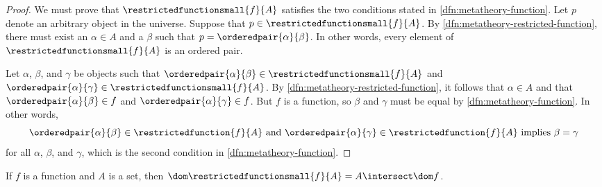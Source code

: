 \begin{proof}
    We must prove that \( \restrictedfunctionsmall{f}{A} \) satisfies the two conditions stated in \cref{dfn:metatheory-function}.
    Let \( p \) denote an arbitrary object in the universe. Suppose that \( p \in \restrictedfunctionsmall{f}{A} \).
    By \cref{dfn:metatheory-restricted-function}, there must exist an \( \alpha \in A \) and a \( \beta \) such that
    \( p = \orderedpair{\alpha}{\beta} \). In other words, every element of \( \restrictedfunctionsmall{f}{A} \) is an ordered pair.

    \vspace{0.3cm}
    \noindent
    Let \( \alpha \), \( \beta \), and \( \gamma \) be objects such that \( \orderedpair{\alpha}{\beta} \in \restrictedfunctionsmall{f}{A} \)
    and \( \orderedpair{\alpha}{\gamma} \in \restrictedfunctionsmall{f}{A} \).
    By \cref{dfn:metatheory-restricted-function}, it follows that \( \alpha \in A \) and that \( \orderedpair{\alpha}{\beta} \in f \)
    and \( \orderedpair{\alpha}{\gamma} \in f\).
    But \( f \) is a function, so \( \beta \) and \( \gamma \) must be equal by \cref{dfn:metatheory-function}.
    In other words,
    \begin{equation*}
        \orderedpair{\alpha}{\beta} \in \restrictedfunction{f}{A} \ \text{and} \ \orderedpair{\alpha}{\gamma} \in \restrictedfunction{f}{A} \ \text{implies} \ \beta = \gamma
    \end{equation*}
    for all \( \alpha \), \( \beta \), and \( \gamma \), which is the second condition in \cref{dfn:metatheory-function}.
\end{proof}

\begin{thm}
     \label{thm:metatheory-domain-of-restriction-of-f-to-A-is-the-intersection-between-dom-f-and-A}
    If \( f \) is a function and \( A \) is a set, then \( \dom \restrictedfunctionsmall{f}{A} = A \intersect \dom f \).
\end{thm}


